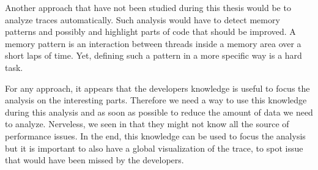 Another approach that have not been studied during this thesis would be to analyze traces automatically.
Such analysis would have to detect memory patterns and possibly and highlight parts of code that should be improved.
A memory pattern is an interaction between threads inside a memory area over a short laps of time.
Yet, defining such a pattern in a more specific way is a hard task.

For any approach, it appears that the developers knowledge is useful to focus the analysis on the interesting parts.
Therefore we need a way to use this knowledge during this analysis and as soon as possible to reduce the amount of data we need to analyze.
Nerveless, we seen in  that they might not know all the source of performance issues.
In the end, this knowledge can be used to focus the analysis but it is important to also have a global visualization of the trace, to spot issue that would have been missed by the developers.


